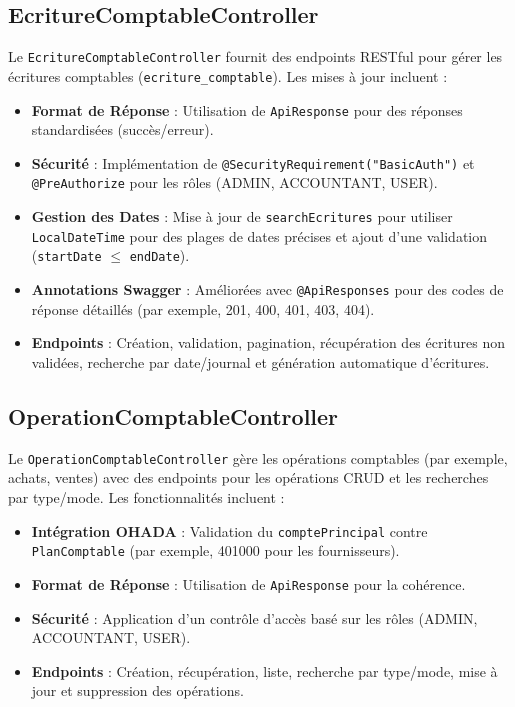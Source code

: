 \documentclass[a4paper,12pt]{article}
\begin{document}
\subsection{EcritureComptableController}
Le \texttt{EcritureComptableController} fournit des endpoints RESTful pour gérer les écritures comptables (\texttt{ecriture_comptable}). Les mises à jour incluent :
\begin{itemize}
    \item \textbf{Format de Réponse} : Utilisation de \texttt{ApiResponse} pour des réponses standardisées (succès/erreur).
    \item \textbf{Sécurité} : Implémentation de \texttt{@SecurityRequirement("BasicAuth")} et \texttt{@PreAuthorize} pour les rôles (ADMIN, ACCOUNTANT, USER).
    \item \textbf{Gestion des Dates} : Mise à jour de \texttt{searchEcritures} pour utiliser \texttt{LocalDateTime} pour des plages de dates précises et ajout d'une validation (\texttt{startDate} $\leq$ \texttt{endDate}).
    \item \textbf{Annotations Swagger} : Améliorées avec \texttt{@ApiResponses} pour des codes de réponse détaillés (par exemple, 201, 400, 401, 403, 404).
    \item \textbf{Endpoints} : Création, validation, pagination, récupération des écritures non validées, recherche par date/journal et génération automatique d'écritures.
\end{itemize}

\subsection{OperationComptableController}
Le \texttt{OperationComptableController} gère les opérations comptables (par exemple, achats, ventes) avec des endpoints pour les opérations CRUD et les recherches par type/mode. Les fonctionnalités incluent :
\begin{itemize}
    \item \textbf{Intégration OHADA} : Validation du \texttt{comptePrincipal} contre \texttt{PlanComptable} (par exemple, 401000 pour les fournisseurs).
    \item \textbf{Format de Réponse} : Utilisation de \texttt{ApiResponse} pour la cohérence.
    \item \textbf{Sécurité} : Application d'un contrôle d'accès basé sur les rôles (ADMIN, ACCOUNTANT, USER).
    \item \textbf{Endpoints} : Création, récupération, liste, recherche par type/mode, mise à jour et suppression des opérations.
\end{itemize}
\end{document}

